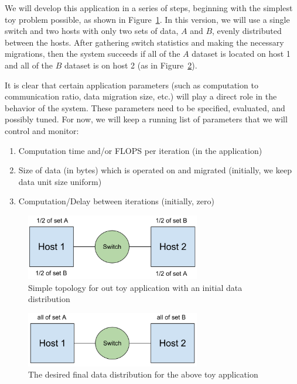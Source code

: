 \documentclass[12pt]{article} \usepackage{graphicx} \usepackage{amsmath}
\begin{document}
We will develop this application in a series of steps, beginning with the
simplest toy problem possible, as shown in Figure~\ref{fig:toy1}.  In this
version, we will use a single switch and two hosts with only two sets of data,
$A$ and $B$, evenly distributed between the hosts.  After gathering switch
statistics and making the necessary migrations, then the system succeeds if all
of the $A$ dataset is located on host 1 and all of the $B$ dataset is on host 2
(as in Figure~\ref{fig:toy2}).

It is clear that certain application parameters (such as
computation to communication ratio, data migration size, etc.) will play a direct
role in the behavior of the system.  These parameters need to be specified,
evaluated, and possibly tuned.  For now, we will keep a running list of
parameters that we will control and monitor: 
\begin{enumerate} 
  \item Computation time and/or FLOPS per iteration (in the application) 
  \item Size of data (in bytes) which is operated on and migrated (initially, we keep
  data unit size uniform) 
  \item Computation/Delay between iterations (initially, zero)
\end{enumerate}

\begin{figure}[t] \centerline{\includegraphics[width=3.0in]{img/toy1.png}}
\caption{Simple topology for out toy application with an initial data
distribution} \label{fig:toy1} \end{figure}

\begin{figure}[t] \centerline{\includegraphics[width=3.0in]{img/toy2.png}}
\caption{The desired final data distribution for the above toy application}
\label{fig:toy2} \end{figure}
\end{document}
